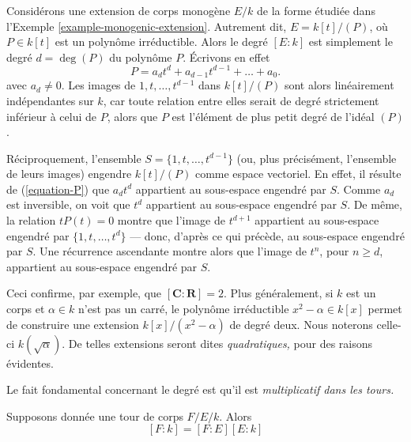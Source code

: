 \begin{example}
\label{example-degree-simple-algebraic-extension}
Considérons une extension de corps monogène $E/k$ de la forme étudiée dans
l'Exemple \ref{example-monogenic-extension}.
Autrement dit, $E = k[t]/(P)$, où $P \in k[t]$ est un polynôme irréductible.
Alors le degré $[E : k]$ est simplement le degré $d = \deg(P)$ du
polynôme $P$. Écrivons en effet
\begin{equation}
\label{equation-P}
P = a_d t^d + a_{d - 1} t^{d - 1} + \ldots + a_0.
\end{equation}
avec $a_d \not = 0$. Les images de $1, t, \ldots, t^{d - 1}$ dans
$k[t]/(P)$ sont alors linéairement indépendantes sur $k$, car toute relation entre
elles serait de degré strictement inférieur à celui de $P$, alors que $P$ est
l'élément de plus petit degré de l'idéal $(P)$.

\medskip\noindent
Réciproquement, l'ensemble $S = \{1, t, \ldots, t^{d - 1}\}$ (ou, plus
précisément, l'ensemble de leurs images) engendre $k[t]/(P)$ comme espace vectoriel.
En effet, il résulte de (\ref{equation-P}) que $a_d t^d$ appartient au sous-espace engendré par $S$.
Comme $a_d$ est inversible, on voit que $t^d$ appartient au sous-espace engendré par $S$.
De même, la relation $t P(t) = 0$ montre que l'image de $t^{d + 1}$
appartient au sous-espace engendré par $\{1, t, \ldots, t^d\}$ --- donc, d'après ce qui précède,
au sous-espace engendré par $S$. Une récurrence ascendante montre alors
que l'image de $t^n$, pour $n \geq d$, appartient au sous-espace engendré par $S$.
\end{example}

\noindent
Ceci confirme, par exemple, que $[\mathbf{C}: \mathbf{R}] = 2$. Plus généralement,
si $k$ est un corps et $\alpha \in k$ n'est pas un carré, le polynôme irréductible
$x^2 - \alpha \in k[x]$ permet de construire une extension $k[x]/(x^2 - \alpha)$
de degré deux.
Nous noterons celle-ci $k(\sqrt{\alpha})$. De telles extensions seront dites
{\it quadratiques,} pour des raisons évidentes.

\medskip\noindent
Le fait fondamental concernant le degré est qu'il est {\it multiplicatif dans les tours.}

\begin{lemma}[Multiplicativité]
\label{lemma-multiplicativity-degrees}
Supposons donnée une tour de corps $F/E/k$. Alors
$$
[F:k] = [F:E][E:k]
$$
\end{lemma}

